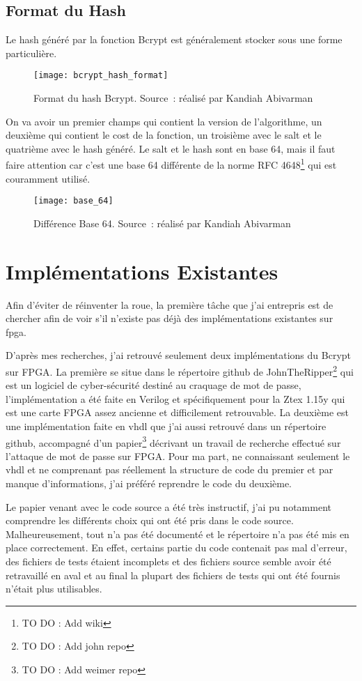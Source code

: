 \subsection{Format du Hash}

Le hash généré par la fonction Bcrypt est généralement stocker sous une forme particulière. 

\begin{figure}[tbph!]
	\centering
	\texttt{[image: bcrypt\_hash\_format]}
	\caption[Format du hash Bcrypt]{Format du hash Bcrypt. Source : réalisé par Kandiah Abivarman}
	\label{fig:bcrypt_hash_format}
\end{figure}

On va avoir un premier champs qui contient la version de l'algorithme, un deuxième qui contient le cost de la fonction, un troisième avec le salt et le quatrième avec le hash généré. Le salt et le hash sont en base 64, mais il faut faire attention car c'est une base 64 différente de la norme RFC 4648\footnote{TO DO : Add wiki} qui est couramment utilisé.

\begin{figure}[tbph!]
	\centering
	\texttt{[image: base\_64]}
	\caption[Différence Base 64]{Différence Base 64. Source : réalisé par Kandiah Abivarman}
	\label{fig:base_64}
\end{figure}

\section{Implémentations Existantes}

Afin d'éviter de réinventer la roue, la première tâche que j'ai entrepris est de chercher afin de voir s'il n'existe pas déjà des implémentations existantes sur \gls{fpga}. 

D'après mes recherches, j'ai retrouvé seulement deux implémentations du Bcrypt sur FPGA. La première se situe dans le répertoire github de JohnTheRipper\footnote{TO DO : Add john repo} qui est un logiciel de cyber-sécurité destiné au craquage de mot de passe, l'implémentation a été faite en Verilog et spécifiquement pour la Ztex 1.15y qui est une carte FPGA assez ancienne et difficilement retrouvable. La deuxième est une implémentation faite en \gls{vhdl} que j'ai aussi retrouvé dans un répertoire github, accompagné d'un papier\footnote{TO DO : Add weimer repo} décrivant un travail de recherche effectué sur l'attaque de mot de passe sur FPGA. Pour ma part, ne connaissant seulement le \gls{vhdl} et ne comprenant pas réellement la structure de code du premier et par manque d'informations, j'ai préféré reprendre le code du deuxième. 

Le papier venant avec le code source a été très instructif, j'ai pu notamment comprendre les différents choix qui ont été pris dans le code source. Malheureusement, tout n'a pas été documenté et le répertoire n'a pas été mis en place correctement. En effet, certains partie du code contenait pas mal d'erreur, des fichiers de tests étaient incomplets et des fichiers source semble avoir été retravaillé en aval et au final la plupart des fichiers de tests qui ont été fournis n'était plus utilisables.